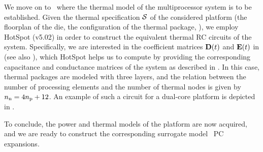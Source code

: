 
We move on to \ where the thermal model of the multiprocessor system is to be established.
Given the thermal specification $\mathcal{S}$ of the considered platform (the floorplan of the die, the configuration of the thermal package, \etc), we employ HotSpot (v5.02) \cite{hotspot} in order to construct the equivalent thermal RC circuits of the system.
Specifically, we are interested in the coefficient matrices $\mCF(\t)$ and $\mCS(\t)$ in  (see also ), which HotSpot helps us to compute by providing the corresponding capacitance and conductance matrices of the system as described in .
In this case, thermal packages are modeled with three layers, and the relation between the number of processing elements and the number of thermal nodes is given by ${n_\text{n}} = 4 {n_\text{p}} + 12$.
An example of such a circuit for a dual-core platform is depicted in .

To conclude, the power and thermal models of the platform are now acquired, and we are ready to construct the corresponding surrogate model \via\ PC expansions.
